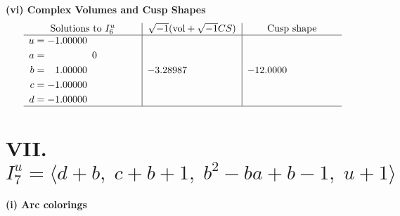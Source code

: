 \documentclass[1p]{elsarticle_modified}
\theoremstyle{definition}
\newcommand{\I}{\sqrt{-1}}
\begin{document}
\newpage\flushleft \textbf{(vi) Complex Volumes and Cusp Shapes}
$$\begin{array}{c|c|c}  
\text{Solutions to }I^u_{6}& \I (\text{vol} + \sqrt{-1}CS) & \text{Cusp shape}\\
 \hline 
\begin{aligned}
u &= -1.00000\phantom{ +0.000000I} \\
a &= \phantom{-0.000000 } 0 \\
b &= \phantom{-}1.00000\phantom{ +0.000000I} \\
c &= -1.00000\phantom{ +0.000000I} \\
d &= -1.00000\phantom{ +0.000000I}\end{aligned}
 & -3.28987\phantom{ +0.000000I} & -12.0000\phantom{ +0.000000I}\\
 \hline 
 \end{array}$$\newpage\newpage\renewcommand{\arraystretch}{1}
\centering \section*{VII. $I^u_{7}= \langle d+b,\;c+b+1,\;b^2- b a+b-1,\;u+1 \rangle$}
\flushleft \textbf{(i) Arc colorings}\\
\end{document}
